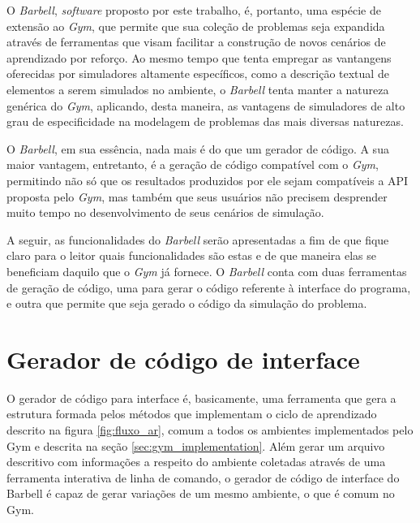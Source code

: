 \documentclass[cic,tc]{iiufrgs}
\begin{document}
O \textit{Barbell}, \textit{software} proposto por este trabalho, é, portanto,
uma espécie de extensão ao \textit{Gym}, que permite que sua coleção de
problemas seja expandida através de ferramentas que visam facilitar a construção
de novos cenários de aprendizado por reforço. Ao mesmo tempo que tenta empregar
as vantangens oferecidas por simuladores altamente específicos, como a descrição
textual de elementos a serem simulados no ambiente, o \textit{Barbell} tenta
manter a natureza genérica do \textit{Gym}, aplicando, desta maneira, as
vantagens de simuladores de alto grau de especificidade na modelagem de
problemas das mais diversas naturezas.


O \textit{Barbell}, em sua essência, nada mais é do que um gerador de código. A
sua maior vantagem, entretanto, é a geração de código compatível com o \textit{Gym},
permitindo não só que os resultados produzidos por ele sejam compatíveis a API
proposta pelo \textit{Gym}, mas também que seus usuários não precisem desprender
muito tempo no desenvolvimento de seus cenários de simulação.

A seguir, as funcionalidades do
\textit{Barbell} serão apresentadas a fim de que fique claro para o leitor
quais funcionalidades são estas e de que maneira elas se beneficiam daquilo
que o \textit{Gym} já fornece. O \textit{Barbell} conta com duas ferramentas de
geração de código, uma para gerar o código referente à interface do programa, e
outra que permite que seja gerado o código da simulação do problema.


\section{Gerador de código de interface}

O gerador de código para interface é, basicamente, uma ferramenta que gera a
estrutura formada pelos métodos que implementam o ciclo de aprendizado descrito
na figura \ref{fig:fluxo_ar}, comum a todos os ambientes implementados pelo Gym
e descrita na seção \ref{sec:gym_implementation}. Além gerar um arquivo descritivo
com informações a respeito do ambiente coletadas através de uma ferramenta
interativa de linha de comando, o gerador de código de interface do Barbell é
capaz de gerar variações de um mesmo ambiente, o que é comum no Gym.
\end{document}
